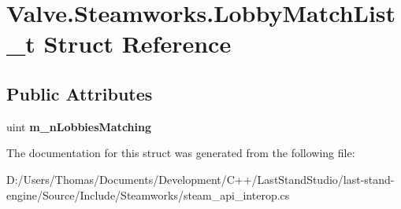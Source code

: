\hypertarget{structValve_1_1Steamworks_1_1LobbyMatchList__t}{}\section{Valve.\+Steamworks.\+Lobby\+Match\+List\+\_\+t Struct Reference}
\label{structValve_1_1Steamworks_1_1LobbyMatchList__t}
\subsection*{Public Attributes}
\begin{DoxyCompactItemize}
\item 
\hypertarget{structValve_1_1Steamworks_1_1LobbyMatchList__t_aaa0d84839275b9d2d0e47b3fd3830c75}{}uint {\bfseries m\+\_\+n\+Lobbies\+Matching}\label{structValve_1_1Steamworks_1_1LobbyMatchList__t_aaa0d84839275b9d2d0e47b3fd3830c75}

\end{DoxyCompactItemize}


The documentation for this struct was generated from the following file\+:\begin{DoxyCompactItemize}
\item 
D\+:/\+Users/\+Thomas/\+Documents/\+Development/\+C++/\+Last\+Stand\+Studio/last-\/stand-\/engine/\+Source/\+Include/\+Steamworks/steam\+\_\+api\+\_\+interop.\+cs\end{DoxyCompactItemize}
